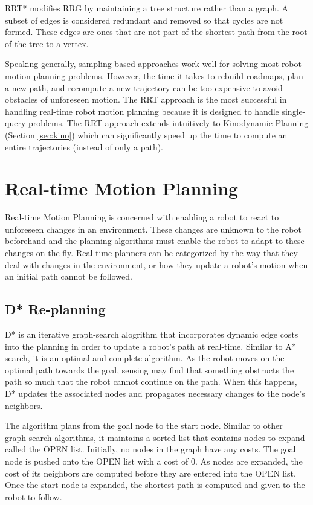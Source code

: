 \documentclass[10pt,conference]{ieeeconf}
\begin{document}
RRT* modifies RRG by maintaining a tree structure rather than a graph. A subset of edges is considered redundant and removed so that cycles are not formed. These edges are ones that are not part of the shortest path from the root of the tree to a vertex.


Speaking generally, sampling-based approaches work well for solving most robot motion planning problems. However, the time it takes to rebuild roadmaps, plan a new path, and recompute a new trajectory can be too expensive to avoid obstacles of unforeseen motion. The RRT approach is the most successful in handling real-time robot motion planning because it is designed to handle single-query problems. The RRT approach extends intuitively to Kinodynamic Planning (Section \ref{sec:kino}) which can significantly speed up the time to compute an entire trajectories (instead of only a path).



\section{Real-time Motion Planning} \label{sec:real-time}

Real-time Motion Planning is concerned with enabling a robot to react to unforeseen changes in an environment. These changes are unknown to the robot beforehand and the planning algorithms must enable the robot to adapt to these changes on the fly. Real-time planners can be categorized by the way that they deal with changes in the environment, or how they update a robot's motion when an initial path cannot be followed.


\subsection{D* Re-planning} \label{sec:dstar}

D* \cite{stentz1994optimal} is an iterative graph-search alogrithm that incorporates dynamic edge costs into the planning in order to update a robot's path at real-time. Similar to A* search, it is an optimal and complete algorithm. As the robot moves on the optimal path towards the goal, sensing may find that something obstructs the path so much that the robot cannot continue on the path. When this happens, D* updates the associated nodes and propagates necessary changes to the node's neighbors.

The algorithm plans from the goal node to the start node. Similar to other graph-search algorithms, it maintains a sorted list that contains nodes to expand called the OPEN list. Initially, no nodes in the graph have any costs. The goal node is pushed onto the OPEN list with a cost of 0. As nodes are expanded, the cost of its neighbors are computed before they are entered into the OPEN list. Once the start node is expanded, the shortest path is computed and given to the robot to follow.
\end{document}
